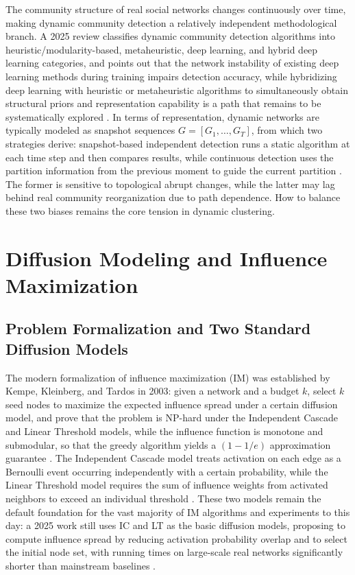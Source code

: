 \documentclass[12pt,a4paper]{article}
\begin{document}
The community structure of real social networks changes continuously over time, making dynamic community detection a relatively independent methodological branch. A 2025 review classifies dynamic community detection algorithms into heuristic/modularity-based, metaheuristic, deep learning, and hybrid deep learning categories, and points out that the network instability of existing deep learning methods during training impairs detection accuracy, while hybridizing deep learning with heuristic or metaheuristic algorithms to simultaneously obtain structural priors and representation capability is a path that remains to be systematically explored \cite{ref5}. In terms of representation, dynamic networks are typically modeled as snapshot sequences $G=[G_1,\dots,G_T]$, from which two strategies derive: snapshot-based independent detection runs a static algorithm at each time step and then compares results, while continuous detection uses the partition information from the previous moment to guide the current partition \cite{ref5}. The former is sensitive to topological abrupt changes, while the latter may lag behind real community reorganization due to path dependence. How to balance these two biases remains the core tension in dynamic clustering.

\section{Diffusion Modeling and Influence Maximization}

\subsection{Problem Formalization and Two Standard Diffusion Models}

The modern formalization of influence maximization (IM) was established by Kempe, Kleinberg, and Tardos in 2003: given a network and a budget $k$, select $k$ seed nodes to maximize the expected influence spread under a certain diffusion model, and prove that the problem is NP-hard under the Independent Cascade and Linear Threshold models, while the influence function is monotone and submodular, so that the greedy algorithm yields a $(1-1/e)$ approximation guarantee \cite{ref6}. The Independent Cascade model treats activation on each edge as a Bernoulli event occurring independently with a certain probability, while the Linear Threshold model requires the sum of influence weights from activated neighbors to exceed an individual threshold \cite{ref6}. These two models remain the default foundation for the vast majority of IM algorithms and experiments to this day: a 2025 work still uses IC and LT as the basic diffusion models, proposing to compute influence spread by reducing activation probability overlap and to select the initial node set, with running times on large-scale real networks significantly shorter than mainstream baselines \cite{ref9}.
\end{document}

